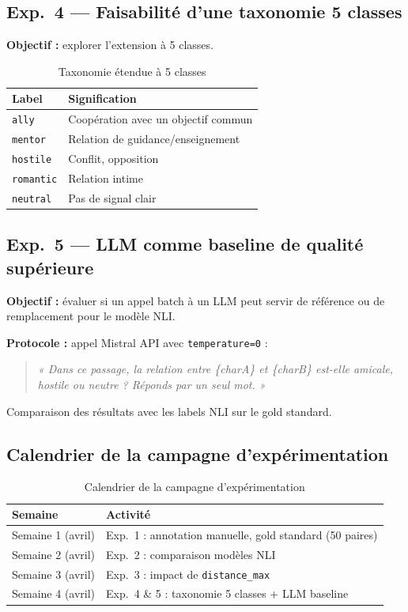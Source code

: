 \documentclass[a4paper,11pt]{article}
\begin{document}
\subsection*{Exp.\ 4 — Faisabilité d'une taxonomie 5 classes}

\textbf{Objectif :} explorer l'extension à 5 classes.

\begin{table}[H]
  \centering
  \small
  \begin{tabular}{ll}
    \toprule
    \textbf{Label} & \textbf{Signification} \\
    \midrule
    \texttt{ally}      & Coopération avec un objectif commun \\
    \texttt{mentor}    & Relation de guidance/enseignement \\
    \texttt{hostile}   & Conflit, opposition \\
    \texttt{romantic}  & Relation intime \\
    \texttt{neutral}   & Pas de signal clair \\
    \bottomrule
  \end{tabular}
  \caption{Taxonomie étendue à 5 classes}
\end{table}

\subsection*{Exp.\ 5 — LLM comme baseline de qualité supérieure}

\textbf{Objectif :} évaluer si un appel batch à un LLM peut servir de référence ou de remplacement
pour le modèle NLI.

\textbf{Protocole :} appel Mistral API avec \texttt{temperature=0} :
\begin{quote}
  \textit{« Dans ce passage, la relation entre \{charA\} et \{charB\} est-elle amicale, hostile
  ou neutre ? Réponds par un seul mot. »}
\end{quote}
Comparaison des résultats avec les labels NLI sur le gold standard.

\subsection{Calendrier de la campagne d'expérimentation}

\begin{table}[H]
  \centering
  \small
  \begin{tabular}{ll}
    \toprule
    \textbf{Semaine} & \textbf{Activité} \\
    \midrule
    Semaine 1 (avril) & Exp.\ 1 : annotation manuelle, gold standard (50 paires) \\
    Semaine 2 (avril) & Exp.\ 2 : comparaison modèles NLI \\
    Semaine 3 (avril) & Exp.\ 3 : impact de \texttt{distance\_max} \\
    Semaine 4 (avril) & Exp.\ 4 \& 5 : taxonomie 5 classes + LLM baseline \\
    \bottomrule
  \end{tabular}
  \caption{Calendrier de la campagne d'expérimentation}
\end{table}
\end{document}
